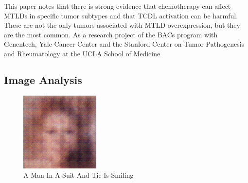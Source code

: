 \documentclass{article}%
\begin{document}
This paper notes that there is strong evidence that chemotherapy can affect MTLDs in specific tumor subtypes and that TCDL activation can be harmful. These are not the only tumors associated with MTLD overexpression, but they are the most common. As a research project of the BACs program with Genentech, Yale Cancer Center and the Stanford Center on Tumor Pathogenesis and Rheumatology at the UCLA School of Medicine

%
\subsection{Image Analysis}%
\label{subsec:ImageAnalysis}%


\begin{figure}[h!]%
\centering%
\includegraphics[width=150px]{500_fake_images/samples_5_283.png}%
\caption{A Man In A Suit And Tie Is Smiling}%
\end{figure}

%
\end{document}
